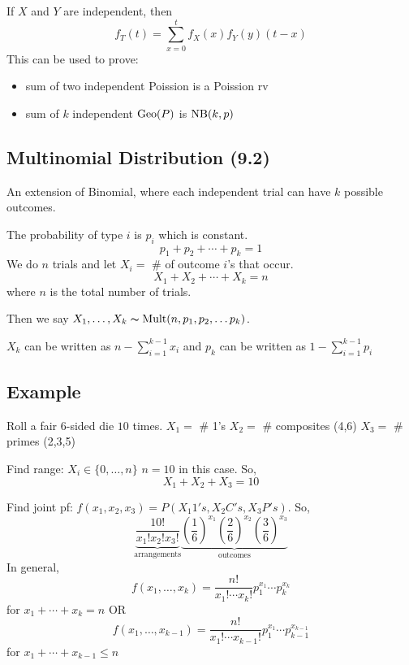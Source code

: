 If $ X $ and $ Y $ are independent, then
\[ f_T(t)=\sum\limits_{x=0}^{t} f_X(x)f_Y(y)(t-x) \]
This can be used to prove:
\begin{itemize}
    \item sum of two independent Poission is a Poission rv
    \item sum of $ k $ independent $ \operatorname{Geo}(P) $ is $ \operatorname{NB}(k,p) $
\end{itemize}

\subsection{Multinomial Distribution (9.2)}
An extension of Binomial, where each independent trial can have
$ k $ possible outcomes.

The probability of type $ i $ is $ p_i $ which is constant.
\[ p_1+p_2+\cdots+p_k=1 \]
We do $ n $ trials and let $ X_i= $ \# of outcome $ i $'s that occur.
\[ X_1+X_2+\cdots+X_k=n \]
where $ n $ is the total number of trials.

Then we say $ X_1,\ldots ,X_k \thicksim \operatorname{Mult}(n,p_1,p_2,\ldots p_k) $.
\begin{remark}
    $ X_k $ can be written as $ n-\sum\limits_{i=1}^{k-1}x_i $ and
    $ p_k $ can be written as $ 1-\sum\limits_{i=1}^{k-1} p_i $
\end{remark}

\subsection{Example}
Roll a fair $6$-sided die $ 10 $ times.
$ X_1= $ \# 1's
$ X_2= $ \# composites (4,6)
$ X_3= $ \# primes (2,3,5)

Find range: $ X_i\in \{0,\ldots ,n\} $ $ n=10 $ in this case. So,
\[ X_1+X_2+X_3=10 \]

Find joint pf: $ f({x_1},{x_2},{x_3})=P(X_1 1's, X_2 C's, X_3 P's) $. So,
\[ \underbrace{\frac{10!}{{x_1}!{x_2}!{x_3}!}}_{\text{arrangements}}
\underbrace{\left( \frac{1}{6}  \right)^{x_1} 
\left( \frac{2}{6} \right)^{x_2} \left( \frac{3}{6} \right)^{x_3}}_{\text{outcomes}}\]
In general,
\[ f({x_1},\ldots,x_k)=\frac{n!}{{x_1}!\cdots x_k!}p_1^{{x_1}} \cdots p_k^{x_k}\]
for $ {x_1}+\cdots+x_k=n $
OR
\[ f({x_1},\ldots,x_{k-1})=\frac{n!}{{x_1}!\cdots x_{k-1}!}p_1^{{x_1}} \cdots
p_{k-1}^{x_{k-1}}\]
for $ {x_1}+\cdots+x_{k-1}\le n $

